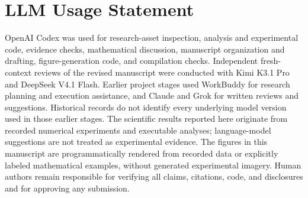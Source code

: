\documentclass[10pt,twocolumn,letterpaper]{article}
\begin{document}
\section*{LLM Usage Statement}
OpenAI Codex was used for research-asset inspection, analysis and experimental code, evidence checks, mathematical discussion, manuscript organization and drafting, figure-generation code, and compilation checks. Independent fresh-context reviews of the revised manuscript were conducted with Kimi K3.1 Pro and DeepSeek V4.1 Flash. Earlier project stages used WorkBuddy for research planning and execution assistance, and Claude and Grok for written reviews and suggestions. Historical records do not identify every underlying model version used in those earlier stages. The scientific results reported here originate from recorded numerical experiments and executable analyses; language-model suggestions are not treated as experimental evidence. The figures in this manuscript are programmatically rendered from recorded data or explicitly labeled mathematical examples, without generated experimental imagery. Human authors remain responsible for verifying all claims, citations, code, and disclosures and for approving any submission.

{\small

}
\end{document}
